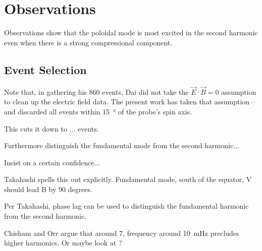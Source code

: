 


\chapter{Observations}
  \label{ch_rbsp}


Observations show that the poloidal mode is most excited in the second harmonic\cite{cummings_1969,hughes_1978,arthur_1981,singer_1982,takahashi_1984,engebretson_1988} even when there is a strong compressional component\cite{takahashi_1987,haerendel_1999,vaivads_2001,sibeck_2012}. 

\section{Event Selection}




Note that, in gathering his 860 events, Dai\cite{dai_2015} did not take the $\vec{E} \cdot \vec{B} = 0$ assumption to clean up the electric field data. The present work has taken that assumption -- and discarded all events within \SI{15}{\degree} of the probe's spin axis. 

This cuts it down to ... events. 

Furthermore distinguish the fundamental mode from the second harmonic...

Insist on a certain confidence... 




Takahashi\cite{takahashi_2013} spells this out explicitly. Fundamental mode, south of the equator, V should lead B by 90 degrees. 

Per Takahashi\cite{takahashi_2011}, phase lag can be used to distinguish the fundamental harmonic from the second harmonic. 

Chisham and Orr\cite{chisham_1991} argue that around \SI{7}{\RE}, frequency around \SI{10}{\mHz} precludes higher harmonics. Or maybe look at \cite{green_1985}?

